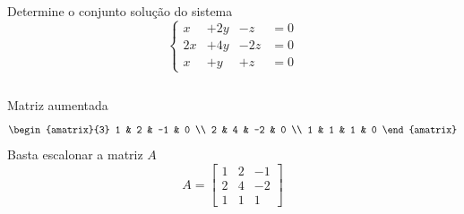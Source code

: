 \begin{question}
  Determine o conjunto solução do sistema
  \[
    \left\{\begin{array}{rrrr}
       x & + 2y & -  z & = 0 \\
      2x & + 4y & - 2z & = 0 \\
       x & +  y & +  z & = 0
    \end{array}\right.
  \]

  \bigskip
  \begin{columns}[t]
    \pause
    Matriz aumentada
    \[
      \begin{amatrix}{3}
        1 & 2 & -1 & 0 \\
        2 & 4 & -2 & 0 \\
        1 & 1 & 1  & 0
      \end{amatrix}
    \]
    \pause
    Basta escalonar a matriz $A$
    \[
      A =
      \begin{bmatrix}
        1 & 2 & -1  \\
        2 & 4 & -2  \\
        1 & 1 &  1
      \end{bmatrix}
    \]
  \end{columns}
\end{question}

